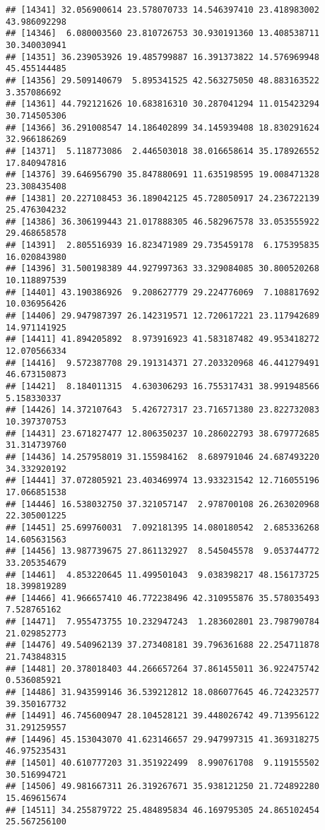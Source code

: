 \documentclass[
]{article}
\begin{document}
\begin{verbatim}
## [14341] 32.056900614 23.578070733 14.546397410 23.418983002 43.986092298
## [14346]  6.080003560 23.810726753 30.930191360 13.408538711 30.340030941
## [14351] 36.239053926 19.485799887 16.391373822 14.576969948 45.455144485
## [14356] 29.509140679  5.895341525 42.563275050 48.883163522  3.357086692
## [14361] 44.792121626 10.683816310 30.287041294 11.015423294 30.714505306
## [14366] 36.291008547 14.186402899 34.145939408 18.830291624 32.966186269
## [14371]  5.118773086  2.446503018 38.016658614 35.178926552 17.840947816
## [14376] 39.646956790 35.847880691 11.635198595 19.008471328 23.308435408
## [14381] 20.227108453 36.189042125 45.728050917 24.236722139 25.476304232
## [14386] 36.306199443 21.017888305 46.582967578 33.053555922 29.468658578
## [14391]  2.805516939 16.823471989 29.735459178  6.175395835 16.020843980
## [14396] 31.500198389 44.927997363 33.329084085 30.800520268 10.118897539
## [14401] 43.190386926  9.208627779 29.224776069  7.108817692 10.036956426
## [14406] 29.947987397 26.142319571 12.720617221 23.117942689 14.971141925
## [14411] 41.894205892  8.973916923 41.583187482 49.953418272 12.070566334
## [14416]  9.572387708 29.191314371 27.203320968 46.441279491 46.673150873
## [14421]  8.184011315  4.630306293 16.755317431 38.991948566  5.158330337
## [14426] 14.372107643  5.426727317 23.716571380 23.822732083 10.397370753
## [14431] 23.671827477 12.806350237 10.286022793 38.679772685 31.314739760
## [14436] 14.257958019 31.155984162  8.689791046 24.687493220 34.332920192
## [14441] 37.072805921 23.403469974 13.933231542 12.716055196 17.066851538
## [14446] 16.538032750 37.321057147  2.978700108 26.263020968 22.305001225
## [14451] 25.699760031  7.092181395 14.080180542  2.685336268 14.605631563
## [14456] 13.987739675 27.861132927  8.545045578  9.053744772 33.205354679
## [14461]  4.853220645 11.499501043  9.038398217 48.156173725 18.399819289
## [14466] 41.966657410 46.772238496 42.310955876 35.578035493  7.528765162
## [14471]  7.955473755 10.232947243  1.283602801 23.798790784 21.029852773
## [14476] 49.540962139 37.273408181 39.796361688 22.254711878 21.743848315
## [14481] 20.378018403 44.266657264 37.861455011 36.922475742  0.536085921
## [14486] 31.943599146 36.539212812 18.086077645 46.724232577 39.350167732
## [14491] 46.745600947 28.104528121 39.448026742 49.713956122 31.291259557
## [14496] 45.153043070 41.623146657 29.947997315 41.369318275 46.975235431
## [14501] 40.610777203 31.351922499  8.990761708  9.119155502 30.516994721
## [14506] 49.981667311 26.319267671 35.938121250 21.724892280 15.469615674
## [14511] 34.255879722 25.484895834 46.169795305 24.865102454 25.567256100

\end{verbatim}
\end{document}
